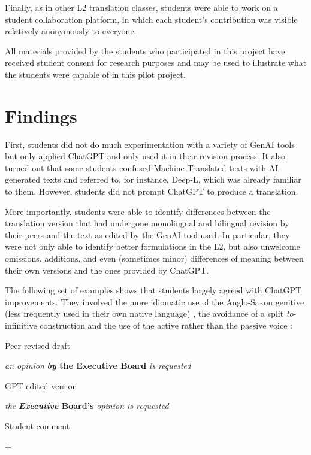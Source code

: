 \documentclass[output=paper]{langscibook}
\begin{document}
Finally, as in other L2 translation classes, students were able to work on a student collaboration platform, in which each student’s contribution was visible relatively anonymously to everyone. 

All materials provided by the students who participated in this project have received student consent for research purposes and may be used to illustrate what the students were capable of in this pilot project. 

\section{Findings}

First, students did not do much experimentation with a variety of GenAI tools but only applied ChatGPT and only used it in their revision process. It also turned out that some students confused Machine-Translated texts with AI-generated texts and referred to, for instance, Deep-L, which was already familiar to them. However, students did not prompt ChatGPT to produce a translation. 

More importantly, students were able to identify differences between the translation version that had undergone monolingual and bilingual revision by their peers and the text as edited by the GenAI tool used. In particular, they were not only able to identify better formulations in the L2, but also unwelcome omissions, additions, and even (sometimes minor) differences of meaning between their own versions and the ones provided by ChatGPT. 

The following set of examples shows that students largely agreed with ChatGPT improvements. They involved the more idiomatic use of the Anglo-Saxon genitive (less frequently used in their own native language) , the avoidance of a split \textit{to}{}-infinitive construction  and the use of the active rather than the passive voice :

\ea%
    \label{ex:10:1}
    \ea  Peer-revised draft

    \textit{an opinion} \textbf{\textit{by} \textbf{the} \textbf{Executive} \textbf{Board}} \textit{is requested}

    \ex  GPT-edited version

    \textit{the} \textbf{\textit{Executive} \textbf{Board’s}} \textit{opinion is requested}

    \ex  Student comment


    +
    \z
\z
\end{document}
